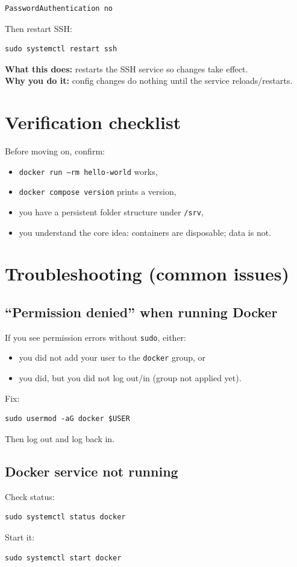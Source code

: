 \begin{lstlisting}
PasswordAuthentication no
\end{lstlisting}

Then restart SSH:

\begin{lstlisting}
sudo systemctl restart ssh
\end{lstlisting}

\textbf{What this does:} restarts the SSH service so changes take effect. \\
\textbf{Why you do it:} config changes do nothing until the service reloads/restarts.

\section{Verification checklist}
Before moving on, confirm:
\begin{itemize}[leftmargin=*]
  \item \texttt{docker run --rm hello-world} works,
  \item \texttt{docker compose version} prints a version,
  \item you have a persistent folder structure under \texttt{/srv},
  \item you understand the core idea: containers are disposable; data is not.
\end{itemize}

\section{Troubleshooting (common issues)}
\subsection{``Permission denied'' when running Docker}
If you see permission errors without \texttt{sudo}, either:
\begin{itemize}[leftmargin=*]
  \item you did not add your user to the \texttt{docker} group, or
  \item you did, but you did not log out/in (group not applied yet).
\end{itemize}

Fix:
\begin{lstlisting}
sudo usermod -aG docker $USER
\end{lstlisting}
Then log out and log back in.

\subsection{Docker service not running}
Check status:
\begin{lstlisting}
sudo systemctl status docker
\end{lstlisting}
Start it:
\begin{lstlisting}
sudo systemctl start docker
\end{lstlisting}

